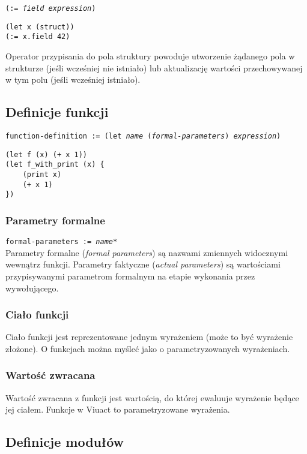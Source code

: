 \documentclass[11pt,oneside,a4paper,titlepage,onecolumn]{article}
\begin{document}
\texttt{(:= \emph{field} \emph{expression})}

\begin{lstlisting}
(let x (struct))
(:= x.field 42)
\end{lstlisting}

Operator przypisania do pola struktury powoduje utworzenie żądanego pola w strukturze (jeśli wcześniej nie
istniało) lub aktualizację wartości przechowywanej w tym polu (jeśli wcześniej istniało).

\subsection{Definicje funkcji}

\texttt{function-definition := (let \emph{name} (\emph{formal-parameters}) \emph{expression})}

\begin{lstlisting}
(let f (x) (+ x 1))
(let f_with_print (x) {
    (print x)
    (+ x 1)
})
\end{lstlisting}

\subsubsection{Parametry formalne}

\texttt{formal-parameters := \emph{name}*}
\\

Parametry formalne (\emph{formal parameters}) są nazwami zmiennych widocznymi wewnątrz funkcji.
Parametry faktyczne (\emph{actual parameters}) są wartościami przypisywanymi parametrom formalnym na etapie
wykonania przez wywołującego.

\subsubsection{Ciało funkcji}

Ciało funkcji jest reprezentowane jednym wyrażeniem (może to być wyrażenie złożone).
O funkcjach można myśleć jako o parametryzowanych wyrażeniach.

\subsubsection{Wartość zwracana}

Wartość zwracana z funkcji jest wartością, do której ewaluuje wyrażenie będące jej ciałem.
Funkcje w Viuact to parametryzowane wyrażenia.

\subsection{Definicje modułów}
\end{document}
